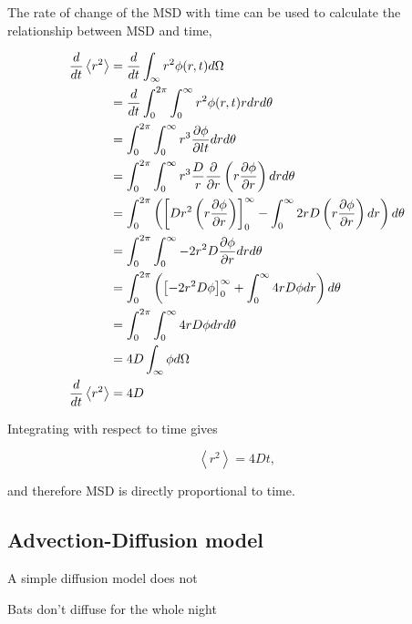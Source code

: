The rate of change of the MSD with time can be used to calculate the relationship between MSD and time,

\begin{equation}
\begin{split}
\frac{d}{dt} \left<r^2\right> &= \frac{d}{dt}\int_{\infty}r^2 \phi(r,t) d\Omega \\
                            &= \frac{d}{dt} \int_0^{2\pi}\int_0^{\infty} r^2 \phi(r,t) r dr d\theta \\
                           &= \int_0^{2\pi} \int_0^{\infty} r^3 \frac{\partial \phi}{\partial l t} dr d\theta \\
                            &= \int_0^{2\pi} \int_0^{\infty} r^3 \frac{D}{r} \frac{\partial }{\partial r } \left( r \frac{\partial  \phi}{\partial  r}\right) dr d\theta \\
                            &= \int_0^{2\pi} \left( \left[ D r^2 \left( r \frac{\partial  \phi}{\partial  r}\right) \right]_0^{\infty} - \int_0^{\infty} 2rD \left(r \frac{\partial \phi}{\partial r} \right) dr \right) d\theta \\
                            &= \int_0^{2\pi} \int_0^{\infty} -2r^2D \frac{\partial  \phi}{\partial r}dr d\theta \\
                            &= \int_0^{2\pi} \left( \left[-2r^2D \phi \right]_0^{\infty} + \int_0^{\infty} 4rD \phi dr \right)d\theta \\
                            &= \int_0^{2\pi} \int_0^{\infty} 4rD\phi dr d\theta \\
                            &= 4D \int_{\infty} \phi d\Omega \\
\frac{d}{dt} \left<r^2\right>  &= 4D \\
\label{eqn:diffusion_1}
\end{split}
\end{equation}

Integrating with respect to time gives

\begin{equation}
\left<r^2\right> = 4Dt ,
\label{eqn:diffusion_msd}
\end{equation}

and therefore MSD is directly proportional to time.


\subsection{Advection-Diffusion model}

A simple diffusion model does not

Bats don't diffuse for the whole night

